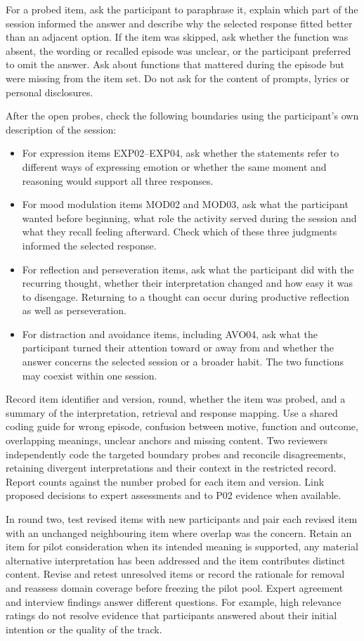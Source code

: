 For a probed item, ask the participant to paraphrase it, explain which part of the session informed the answer and describe why the selected response fitted better than an adjacent option. If the item was skipped, ask whether the function was absent, the wording or recalled episode was unclear, or the participant preferred to omit the answer. Ask about functions that mattered during the episode but were missing from the item set. Do not ask for the content of prompts, lyrics or personal disclosures.

After the open probes, check the following boundaries using the participant's own description of the session:
\begin{itemize}
\item For expression items EXP02--EXP04, ask whether the statements refer to different ways of expressing emotion or whether the same moment and reasoning would support all three responses.
\item For mood modulation items MOD02 and MOD03, ask what the participant wanted before beginning, what role the activity served during the session and what they recall feeling afterward. Check which of these three judgments informed the selected response.
\item For reflection and perseveration items, ask what the participant did with the recurring thought, whether their interpretation changed and how easy it was to disengage. Returning to a thought can occur during productive reflection as well as perseveration.
\item For distraction and avoidance items, including AVO04, ask what the participant turned their attention toward or away from and whether the answer concerns the selected session or a broader habit. The two functions may coexist within one session.
\end{itemize}

Record item identifier and version, round, whether the item was probed, and a summary of the interpretation, retrieval and response mapping. Use a shared coding guide for wrong episode, confusion between motive, function and outcome, overlapping meanings, unclear anchors and missing content. Two reviewers independently code the targeted boundary probes and reconcile disagreements, retaining divergent interpretations and their context in the restricted record. Report counts against the number probed for each item and version. Link proposed decisions to expert assessments and to P02 evidence when available.

In round two, test revised items with new participants and pair each revised item with an unchanged neighbouring item where overlap was the concern. Retain an item for pilot consideration when its intended meaning is supported, any material alternative interpretation has been addressed and the item contributes distinct content. Revise and retest unresolved items or record the rationale for removal and reassess domain coverage before freezing the pilot pool. Expert agreement and interview findings answer different questions. For example, high relevance ratings do not resolve evidence that participants answered about their initial intention or the quality of the track.

